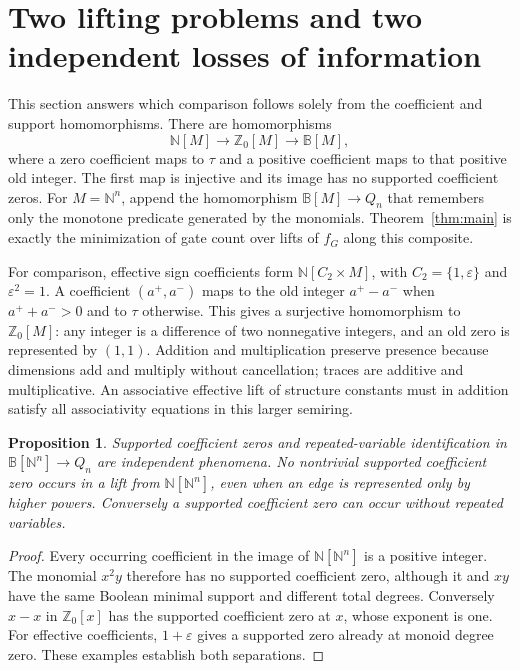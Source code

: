 \documentclass[11pt]{article}
\newcommand{\B}{\mathbb B}
\newcommand{\N}{\mathbb N}
\newcommand{\Z}{\mathbb Z}
\newtheorem{proposition}[theorem]{Proposition}
\theoremstyle{definition}
\theoremstyle{remark}
\begin{document}
\section{Two lifting problems and two independent losses of information}
This section answers which comparison follows solely from the coefficient and support homomorphisms.
There are homomorphisms
\[
 \N[M]\longrightarrow\Z_0[M]\longrightarrow\B[M],
\]
where a zero coefficient maps to $\tau$ and a positive coefficient maps to that positive old integer. The first map is injective and its image has no supported coefficient zeros. For $M=\N^n$, append the homomorphism $\B[M]\to Q_n$ that remembers only the monotone predicate generated by the monomials. Theorem~\ref{thm:main} is exactly the minimization of gate count over lifts of $f_G$ along this composite.

For comparison, effective sign coefficients form $\N[C_2\times M]$, with $C_2=\{1,\varepsilon\}$ and $\varepsilon^2=1$. A coefficient $(a^+,a^-)$ maps to the old integer $a^+-a^-$ when $a^++a^->0$ and to $\tau$ otherwise. This gives a surjective homomorphism to $\Z_0[M]$: any integer is a difference of two nonnegative integers, and an old zero is represented by $(1,1)$. Addition and multiplication preserve presence because dimensions add and multiply without cancellation; traces are additive and multiplicative. An associative effective lift of structure constants must in addition satisfy all associativity equations in this larger semiring.

\begin{proposition}\label{prop:independentlosses}
Supported coefficient zeros and repeated-variable identification in $\B[\N^n]\to Q_n$ are independent phenomena. No nontrivial supported coefficient zero occurs in a lift from $\N[\N^n]$, even when an edge is represented only by higher powers. Conversely a supported coefficient zero can occur without repeated variables.
\end{proposition}
\begin{proof}
Every occurring coefficient in the image of $\N[\N^n]$ is a positive integer. The monomial $x^2y$ therefore has no supported coefficient zero, although it and $xy$ have the same Boolean minimal support and different total degrees. Conversely $x-x$ in $\Z_0[x]$ has the supported coefficient zero at $x$, whose exponent is one. For effective coefficients, $1+\varepsilon$ gives a supported zero already at monoid degree zero. These examples establish both separations.
\end{proof}
\end{document}
